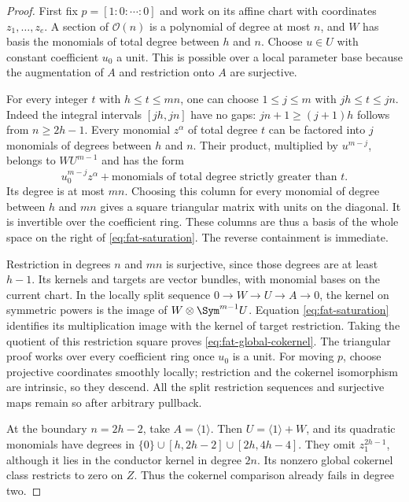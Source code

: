 \begin{proof}
First fix $p=[1:0:\cdots:0]$ and work on its affine chart with
coordinates $z_1,\ldots,z_e$. A section of $\mathcal O(n)$ is a
polynomial of degree at most $n$, and $W$ has basis the monomials
of total degree between $h$ and $n$. Choose $u\in U$ with constant
coefficient $u_0$ a unit. This is possible over a local parameter
base because the augmentation of $A$ and restriction onto $A$ are
surjective.

For every integer $t$ with $h\le t\le mn$, one can choose
$1\le j\le m$ with $jh\le t\le jn$. Indeed the integral intervals
$[jh,jn]$ have no gaps: $jn+1\ge(j+1)h$ follows from $n\ge2h-1$.
Every monomial $z^\alpha$ of total degree $t$ can be factored into
$j$ monomials of degrees between $h$ and $n$. Their product,
multiplied by $u^{m-j}$, belongs to $WU^{m-1}$ and has the form
\[
 u_0^{m-j}z^\alpha+
             \text{monomials of total degree strictly greater than }t.
\]
Its degree is at most $mn$. Choosing this column for every monomial
of degree between $h$ and $mn$ gives a square triangular matrix
with units on the diagonal. It is invertible over the coefficient
ring. These columns are thus a basis of the whole space on the
right of \eqref{eq:fat-saturation}. The reverse containment is immediate.

Restriction in degrees $n$ and $mn$ is surjective, since those
degrees are at least $h-1$. Its kernels and targets are vector
bundles, with monomial bases on the current chart. In the locally
split sequence $0\to W\to U\to A\to0$, the kernel on symmetric
powers is the image of $W\otimes\Sym^{m-1}U$. Equation
\eqref{eq:fat-saturation} identifies its multiplication image with
the kernel of target restriction. Taking the quotient of this
restriction square proves \eqref{eq:fat-global-cokernel}.
The triangular proof works over every coefficient ring once $u_0$
is a unit. For moving $p$, choose projective coordinates smoothly
locally; restriction and the cokernel isomorphism are intrinsic, so
they descend. All the split restriction sequences and surjective
maps remain so after arbitrary pullback.

At the boundary $n=2h-2$, take $A=\langle1\rangle$. Then
$U=\langle1\rangle+W$, and its quadratic monomials have degrees in
$\{0\}\cup[h,2h-2]\cup[2h,4h-4]$. They omit $z_1^{2h-1}$,
although it lies in the conductor kernel in degree $2n$.
Its nonzero global cokernel class restricts to zero on $Z$.
Thus the cokernel comparison already fails in degree two.
\end{proof}

